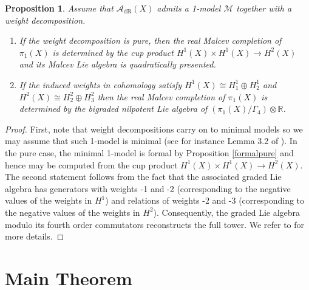 \documentclass[a4paper]{amsart}
\newtheorem{prop}[theo]{Proposition}
\theoremstyle{definition}
\newcommand{\RR}{\mathbb{R}}
\newcommand{\Aa}{\mathcal{A}}
\newcommand{\Mm}{\mathcal{M}}
\newcommand{\dR}{\mathrm{dR}}
\begin{document}
\begin{prop}Assume that $\Aa_{\dR}(X)$ admits a 1-model $\Mm$ together with a weight decomposition.
\begin{enumerate}
 \item If the weight decomposition is pure, then the real Malcev completion of $\pi_1(X)$ is determined
 by the cup product $H^1(X)\times H^1(X)\to H^2(X)$ and its Malcev Lie algebra is quadratically presented.
 \item If the induced weights in cohomology satisfy
 $H^1(X)\cong H^1_1\oplus H^1_2$ and $H^2(X)\cong H^2_2\oplus H^2_3$
 then the real Malcev completion of $\pi_1(X)$ is determined by the bigraded nilpotent Lie algebra of $(\pi_1(X)/\Gamma_4)\otimes\RR$.
\end{enumerate}
\end{prop}
\begin{proof}
First, note that weight decompositions carry on to minimal models so we may assume that such 1-model is minimal (see for instance Lemma 3.2 of \cite{Thom}).
In the pure case, the minimal 1-model is formal by Proposition \ref{formalpure} and hence may be computed from the cup product $H^1(X)\times H^1(X)\to H^2(X)$. The second statement follows from the fact that
the associated graded Lie algebra has generators with weights -1 and -2 (corresponding to the negative values of the weights in $H^1$) and relations of weights -2 and -3 (corresponding to the negative values of the weights in $H^2$). Consequently, the graded Lie algebra modulo its fourth order commutators reconstructs the full tower. We refer to \cite{Morgan} for more details.
\end{proof}

\section{Main Theorem}
\end{document}
